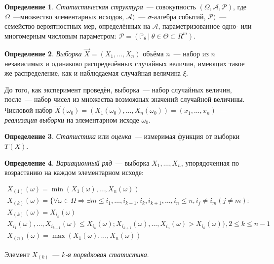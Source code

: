 \documentclass[oneside,final,14pt]{extreport}
\theoremstyle{definition}
\newtheorem{defn}{Определение}[section]
\begin{document}
\begin{defn}
{\it Статистическая структура}~--- совокупность \( (\Omega, \mathcal{A}, \mathcal{P}) \), где \( \Omega \)~---множество элементарных исходов, \( \mathcal{A} )\)~--- \( \sigma \)-алгебра событий, \( \mathcal{P}) \)~--- семейство вероятностных мер, определённых на \( \mathcal{A} \), параметризованное одно- или многомерным числовым параметром: \( \mathcal{P} = (\mathbb{P}_{\theta}~|~\theta \in \Theta \subset R^{m}) \).
\end{defn}

\begin{defn}
{\it Выборка} \( \vec{X} = (X_{1}, \ldots, X_{n}) \) объёма \( n \)~--- набор из \( n \) независимых и одинаково распределённых случайных величин, имеющих такое же распределение, как и наблюдаемая случайная величина \( \xi \).
\end{defn}

До того, как эксперимент проведён, выборка~--- набор случайных величин, после~--- набор чисел из множества возможных значений случайной величины. Числовой набор \( \vec{X}(\omega_0) = (X_{1}(\omega_0), \ldots, X_{n}(\omega_0)) = (x_1, \ldots, x_n) \)~--- {\it реализация выборки} на элементарном исходе \( \omega_0 \).

\begin{defn}
{\it Статистика} или {\it оценка}~--- измеримая функция от выборки \( T(X) \).
\end{defn}

\begin{defn}
{\it Вариационный ряд}~--- выборка \( X_{1}, \ldots, X_{n} \), упорядоченная по возрастанию на каждом элементарном исходе:
\end{defn}

\( \begin{array}{c}
X_{(1)}(\omega)=\min (X_{1}(\omega), \ldots, X_{n}(\omega)) \\
X_{(k)}(\omega)=\{\forall \omega \in \Omega \Rightarrow \exists m \leq i_{1}, \ldots, i_{k-1}, i_{k}, i_{k+1}, \ldots, i_{n} \leq n, i_{j} \neq i_{m}(j \neq m): \\ 
X_{(k)}(\omega)=X_{i_{k}}(\omega) \\
X_{i_{1}}(\omega), \ldots, X_{i_{k-1}}(\omega) \leq X_{i_{k}}(\omega); X_{i_{k+1}}(\omega), \ldots, X_{i_{n}}(\omega)>X_{i_{k}}(\omega)\}, 2 \leq k \leq n-1 \\
X_{(n)}(\omega)=\max (X_{1}(\omega), \ldots, X_{n}(\omega))
\end{array}
\)

Элемент \( X_{(k)} \)~--- {\it \( k\)-я порядковая статистика}.
\end{document}
